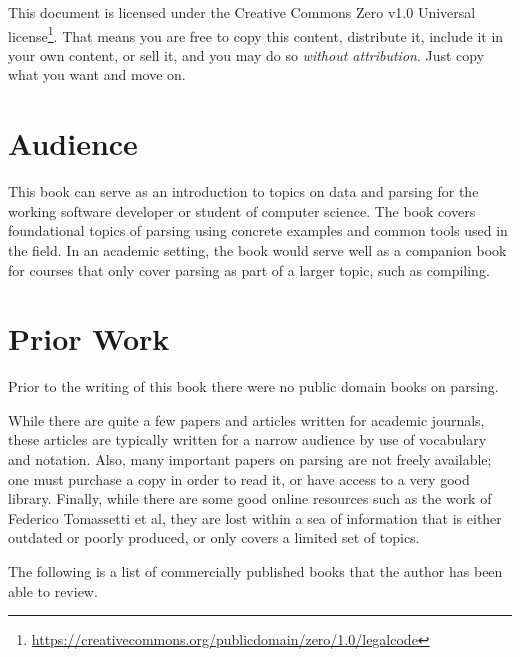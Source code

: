 \documentclass{book}
\begin{document}
This document is licensed under the Creative
Commons Zero v1.0 Universal 
license\footnote{\url{https://creativecommons.org/publicdomain/zero/1.0/legalcode}}.
That means you are free to copy this content,
distribute it, include it in your own content, or sell it, and you may do so
\textit{without attribution}. Just copy what you want and move on.

\section*{Audience}
This book can serve as an introduction to topics on data and parsing for
the working software developer or student of computer science. The book
covers foundational topics of parsing using concrete examples and common
tools used in the field. In an academic setting, the book would serve well as
a companion book for courses that only cover parsing as part of a larger
topic, such as compiling.

\section*{Prior Work}
Prior to the writing of this book there were no public domain 
books on parsing.

While there are quite a few papers and articles written for academic
journals, these articles are typically written for a narrow audience 
by use of vocabulary and notation.
Also, many important papers on parsing are not freely available; one must
purchase a copy in order to read it, or have access to a very good library.
Finally, while there are some good online resources such as the work of
Federico Tomassetti et al, they are lost within a sea of information that
is either outdated or poorly produced, or only covers a limited set of topics.

The following is a list of commercially published books that the author has been 
able to review. 
\end{document}
